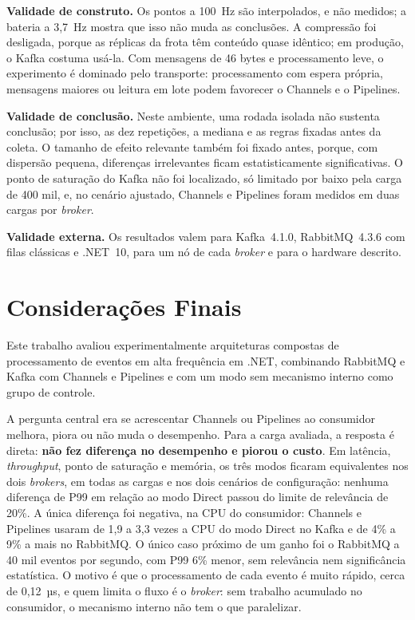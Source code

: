 \documentclass[12pt]{article}
\begin{document}
\textbf{Validade de construto.} Os pontos a 100~Hz são interpolados, e não medidos; a
bateria a 3,7~Hz mostra que isso não muda as conclusões. A compressão foi desligada,
porque as réplicas da frota têm conteúdo quase idêntico; em produção, o Kafka costuma
usá-la. Com mensagens de 46 bytes e processamento leve, o experimento é dominado pelo
transporte: processamento com espera própria, mensagens maiores ou leitura em lote podem
favorecer o Channels e o Pipelines.

\textbf{Validade de conclusão.} Neste ambiente, uma rodada isolada não sustenta
conclusão; por isso, as dez repetições, a mediana e as regras fixadas antes da coleta. O
tamanho de efeito relevante também foi fixado antes, porque, com dispersão pequena,
diferenças irrelevantes ficam estatisticamente significativas. O ponto de saturação do
Kafka não foi localizado, só limitado por baixo pela carga de 400 mil, e, no cenário
ajustado, Channels e Pipelines foram medidos em duas cargas por \textit{broker}.

\textbf{Validade externa.} Os resultados valem para Kafka~4.1.0, RabbitMQ~4.3.6 com filas
clássicas e .NET~10, para um nó de cada \textit{broker} e para o hardware descrito.


\section{Considerações Finais}
\label{sec:conclusao}

Este trabalho avaliou experimentalmente arquiteturas compostas de processamento de eventos
em alta frequência em .NET, combinando RabbitMQ e Kafka com Channels e Pipelines e com um
modo sem mecanismo interno como grupo de controle.

A pergunta central era se acrescentar Channels ou Pipelines ao consumidor melhora, piora
ou não muda o desempenho. Para a carga avaliada, a resposta é direta: \textbf{não fez
diferença no desempenho e piorou o custo}. Em latência, \textit{throughput}, ponto de saturação e
memória, os três modos ficaram equivalentes nos dois \textit{brokers}, em todas as cargas e nos
dois cenários de configuração: nenhuma diferença de P99 em relação ao modo Direct passou do
limite de relevância de 20\%. A única diferença foi negativa, na CPU do consumidor:
Channels e Pipelines usaram de 1,9 a 3,3 vezes a CPU do modo Direct no Kafka e de 4\% a 9\%
a mais no RabbitMQ. O único caso próximo de um ganho foi o RabbitMQ a 40 mil eventos por
segundo, com P99 6\% menor, sem relevância nem significância estatística. O motivo é que o
processamento de cada evento é muito rápido, cerca de 0,12~µs, e quem limita o fluxo é o
\textit{broker}: sem trabalho acumulado no consumidor, o mecanismo interno não tem o que
paralelizar.
\end{document}
